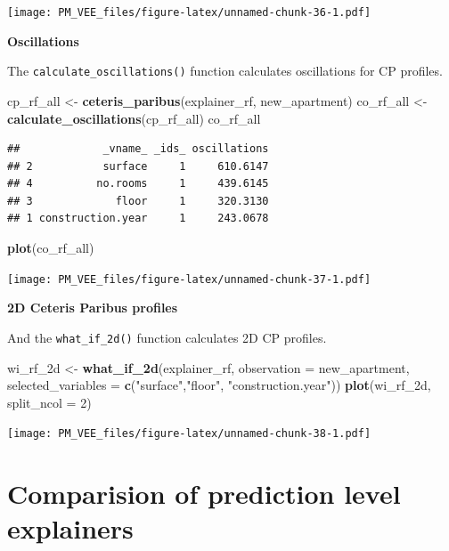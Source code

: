 \documentclass[]{krantz}
\newenvironment{Shaded}{\begin{snugshade}}{\end{snugshade}}
\newcommand{\DataTypeTok}[1]{\textcolor[rgb]{0.13,0.29,0.53}{#1}}
\newcommand{\DecValTok}[1]{\textcolor[rgb]{0.00,0.00,0.81}{#1}}
\newcommand{\KeywordTok}[1]{\textcolor[rgb]{0.13,0.29,0.53}{\textbf{#1}}}
\newcommand{\NormalTok}[1]{#1}
\newcommand{\StringTok}[1]{\textcolor[rgb]{0.31,0.60,0.02}{#1}}
\theoremstyle{definition}
\theoremstyle{definition}
\theoremstyle{definition}
\theoremstyle{remark}
\begin{document}
\texttt{[image: PM\_VEE\_files/figure-latex/unnamed-chunk-36-1.pdf]}

\textbf{Oscillations}

The \texttt{calculate\_oscillations()} function calculates oscillations
for CP profiles.

\begin{Shaded}
\begin{Highlighting}[]
\NormalTok{cp_rf_all <-}\StringTok{ }\KeywordTok{ceteris_paribus}\NormalTok{(explainer_rf, new_apartment)}
\NormalTok{co_rf_all <-}\StringTok{ }\KeywordTok{calculate_oscillations}\NormalTok{(cp_rf_all)}
\NormalTok{co_rf_all}
\end{Highlighting}
\end{Shaded}

\begin{verbatim}
##             _vname_ _ids_ oscillations
## 2           surface     1     610.6147
## 4          no.rooms     1     439.6145
## 3             floor     1     320.3130
## 1 construction.year     1     243.0678
\end{verbatim}

\begin{Shaded}
\begin{Highlighting}[]
\KeywordTok{plot}\NormalTok{(co_rf_all)}
\end{Highlighting}
\end{Shaded}

\texttt{[image: PM\_VEE\_files/figure-latex/unnamed-chunk-37-1.pdf]}

\textbf{2D Ceteris Paribus profiles}

And the \texttt{what\_if\_2d()} function calculates 2D CP profiles.

\begin{Shaded}
\begin{Highlighting}[]
\NormalTok{wi_rf_2d <-}\StringTok{ }\KeywordTok{what_if_2d}\NormalTok{(explainer_rf, }\DataTypeTok{observation =}\NormalTok{ new_apartment, }
                 \DataTypeTok{selected_variables =} \KeywordTok{c}\NormalTok{(}\StringTok{"surface"}\NormalTok{,}\StringTok{"floor"}\NormalTok{, }\StringTok{"construction.year"}\NormalTok{))}
\KeywordTok{plot}\NormalTok{(wi_rf_2d, }\DataTypeTok{split_ncol =} \DecValTok{2}\NormalTok{)}
\end{Highlighting}
\end{Shaded}

\texttt{[image: PM\_VEE\_files/figure-latex/unnamed-chunk-38-1.pdf]}

\hypertarget{comparision-of-prediction-level-explainers}{%
\section{Comparision of prediction level
explainers}\label{comparision-of-prediction-level-explainers}}
\end{document}
